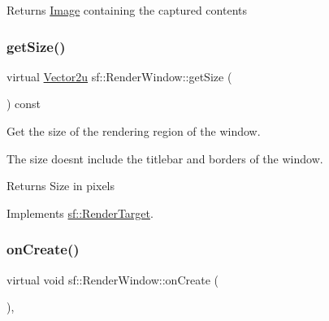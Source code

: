 \begin{DoxyReturn}{Returns}
\mbox{\hyperlink{classsf_1_1_image}{Image}} containing the captured contents \begin{DoxyVerb}\end{DoxyVerb}
 
\end{DoxyReturn}
\mbox{\label{classsf_1_1_render_window_ae3eacf93661c8068fca7a78d57dc7e14}} 
\subsubsection{\texorpdfstring{getSize()}{getSize()}}
{\footnotesize\ttfamily virtual \mbox{\hyperlink{classsf_1_1_vector2}{Vector2u}} sf\+::\+Render\+Window\+::get\+Size (\begin{DoxyParamCaption}{ }\end{DoxyParamCaption}) const\hspace{0.3cm}{\ttfamily [virtual]}}



Get the size of the rendering region of the window. 

The size doesn\textquotesingle{}t include the titlebar and borders of the window.

\begin{DoxyReturn}{Returns}
Size in pixels \begin{DoxyVerb}\end{DoxyVerb}
 
\end{DoxyReturn}


Implements \mbox{\hyperlink{classsf_1_1_render_target_a2e5ade2457d9fb4c4907ae5b3d9e94a5}{sf\+::\+Render\+Target}}.

\mbox{\label{classsf_1_1_render_window_a5bef0040b0fa87bed9fbd459c980d53a}} 
\subsubsection{\texorpdfstring{onCreate()}{onCreate()}}
{\footnotesize\ttfamily virtual void sf\+::\+Render\+Window\+::on\+Create (\begin{DoxyParamCaption}{ }\end{DoxyParamCaption})\hspace{0.3cm}{\ttfamily [protected]}, {\ttfamily [virtual]}}



